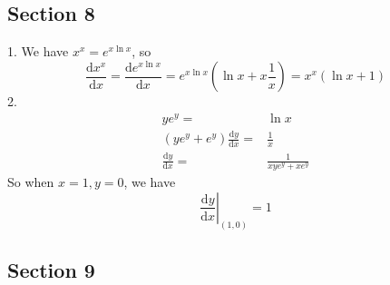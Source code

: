 \subsection{Section 8}
1. We have $x^x=e^{x\ln x}$, so
$$\frac{\mathrm dx^x}{\mathrm dx}=\frac{\mathrm de^{x\ln x}}{\mathrm dx}=e^{x\ln x}(\ln x+x\frac{1}{x})=x^x(\ln x+1)$$
2.
\begin{align*}
    ye^y=&\ln x\\
    (ye^y+e^y)\frac{\mathrm dy}{\mathrm dx}=&\frac{1}{x}\\
    \frac{\mathrm dy}{\mathrm dx}=&\frac{1}{xye^y+xe^y}
\end{align*}
So when $x=1,y=0$, we have
$$\left.\frac{\mathrm dy}{\mathrm dx}\right|_{(1,0)}=1$$
\subsection{Section 9}

